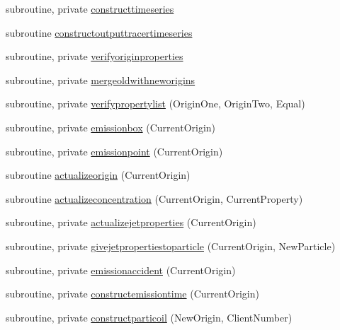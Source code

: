 \begin{DoxyCompactItemize}
\item 
subroutine, private \mbox{\hyperlink{namespacemodulelagrangian_a00248d924be257777ce6bdce98029594}{constructtimeseries}}
\item 
subroutine \mbox{\hyperlink{namespacemodulelagrangian_acead687ed0498394f861396d605a7ce9}{constructoutputtracertimeseries}}
\item 
subroutine, private \mbox{\hyperlink{namespacemodulelagrangian_a3afb63d9461c6e731400252243804a3b}{verifyoriginproperties}}
\item 
subroutine, private \mbox{\hyperlink{namespacemodulelagrangian_aec5a7d886f857814caf3bbd5957b5359}{mergeoldwithneworigins}}
\item 
subroutine, private \mbox{\hyperlink{namespacemodulelagrangian_a601110ba1a707464fc0bffce5261fe4b}{verifypropertylist}} (Origin\+One, Origin\+Two, Equal)
\item 
subroutine, private \mbox{\hyperlink{namespacemodulelagrangian_a909284268900b0a5945c1fde9e70be9c}{emissionbox}} (Current\+Origin)
\item 
subroutine, private \mbox{\hyperlink{namespacemodulelagrangian_a2c2297af310e54bf92d0a22b49d375ca}{emissionpoint}} (Current\+Origin)
\item 
subroutine \mbox{\hyperlink{namespacemodulelagrangian_a116b4ab6ebe8a380c1f61f5764053210}{actualizeorigin}} (Current\+Origin)
\item 
subroutine \mbox{\hyperlink{namespacemodulelagrangian_a597916eb747603cbeb884fab22473311}{actualizeconcentration}} (Current\+Origin, Current\+Property)
\item 
subroutine, private \mbox{\hyperlink{namespacemodulelagrangian_a10887a715db0d544ed022e6dc66acdb2}{actualizejetproperties}} (Current\+Origin)
\item 
subroutine, private \mbox{\hyperlink{namespacemodulelagrangian_a71c61c30f1e91a2e99d88358b92559eb}{givejetpropertiestoparticle}} (Current\+Origin, New\+Particle)
\item 
subroutine, private \mbox{\hyperlink{namespacemodulelagrangian_a979d39b0267ea25c8a2db002477e9ffd}{emissionaccident}} (Current\+Origin)
\item 
subroutine, private \mbox{\hyperlink{namespacemodulelagrangian_aeeff0dc876b075a641427da62012e39e}{constructemissiontime}} (Current\+Origin)
\item 
subroutine, private \mbox{\hyperlink{namespacemodulelagrangian_a4ded42964190b91fb51481ee647db44a}{constructparticoil}} (New\+Origin, Client\+Number)
\item 

\end{DoxyCompactItemize}
